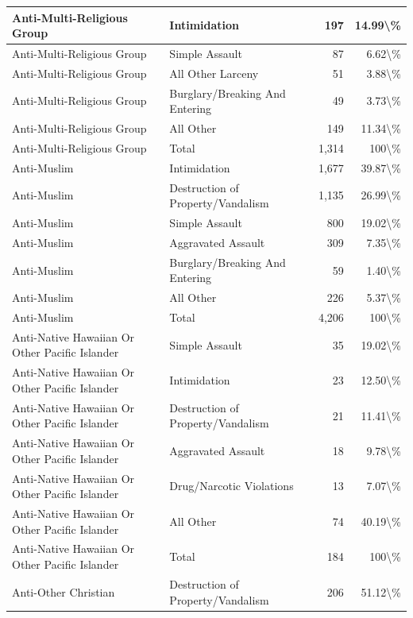 \documentclass[
]{krantz}
\begin{document}
\begin{longtable}[t]{l|l|r|r}
\hline
Anti-Multi-Religious Group & Intimidation & 197 & 14.99\textbackslash{}\%\\
\hline
Anti-Multi-Religious Group & Simple Assault & 87 & 6.62\textbackslash{}\%\\
\hline
Anti-Multi-Religious Group & All Other Larceny & 51 & 3.88\textbackslash{}\%\\
\hline
Anti-Multi-Religious Group & Burglary/Breaking And Entering & 49 & 3.73\textbackslash{}\%\\
\hline
Anti-Multi-Religious Group & All Other & 149 & 11.34\textbackslash{}\%\\
\hline
Anti-Multi-Religious Group & Total & 1,314 & 100\textbackslash{}\%\\
\hline
Anti-Muslim & Intimidation & 1,677 & 39.87\textbackslash{}\%\\
\hline
Anti-Muslim & Destruction of Property/Vandalism & 1,135 & 26.99\textbackslash{}\%\\
\hline
Anti-Muslim & Simple Assault & 800 & 19.02\textbackslash{}\%\\
\hline
Anti-Muslim & Aggravated Assault & 309 & 7.35\textbackslash{}\%\\
\hline
Anti-Muslim & Burglary/Breaking And Entering & 59 & 1.40\textbackslash{}\%\\
\hline
Anti-Muslim & All Other & 226 & 5.37\textbackslash{}\%\\
\hline
Anti-Muslim & Total & 4,206 & 100\textbackslash{}\%\\
\hline
Anti-Native Hawaiian Or Other Pacific Islander & Simple Assault & 35 & 19.02\textbackslash{}\%\\
\hline
Anti-Native Hawaiian Or Other Pacific Islander & Intimidation & 23 & 12.50\textbackslash{}\%\\
\hline
Anti-Native Hawaiian Or Other Pacific Islander & Destruction of Property/Vandalism & 21 & 11.41\textbackslash{}\%\\
\hline
Anti-Native Hawaiian Or Other Pacific Islander & Aggravated Assault & 18 & 9.78\textbackslash{}\%\\
\hline
Anti-Native Hawaiian Or Other Pacific Islander & Drug/Narcotic Violations & 13 & 7.07\textbackslash{}\%\\
\hline
Anti-Native Hawaiian Or Other Pacific Islander & All Other & 74 & 40.19\textbackslash{}\%\\
\hline
Anti-Native Hawaiian Or Other Pacific Islander & Total & 184 & 100\textbackslash{}\%\\
\hline
Anti-Other Christian & Destruction of Property/Vandalism & 206 & 51.12\textbackslash{}\%\\

\end{longtable}
\end{document}
